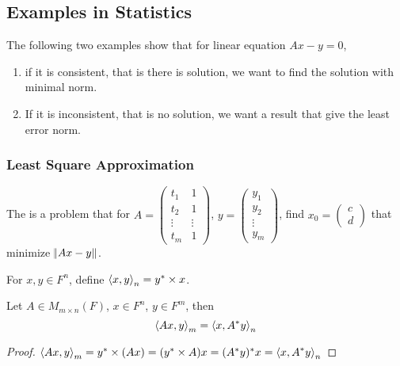 \subsection{Examples in Statistics}

The following two examples show that for linear equation $Ax - y = 0$, 
\begin{enumerate}
    \item if it is consistent, that is there is solution, we want to find the solution with minimal norm.
    \item If it is inconsistent, that is no solution, we want a result that give the least error norm.
\end{enumerate}


\subsubsection{Least Square Approximation}


\begin{definition}
    The  is a problem that for $A = \begin{pmatrix}
        t_1 & 1 \\
        t_2 & 1 \\
        \vdots & \vdots \\
        t_m & 1
    \end{pmatrix}$,  $y = \begin{pmatrix}
        y_1\\
        y_2\\
        \vdots\\
        y_m
    \end{pmatrix}$, find $x_0 = \begin{pmatrix}
        c \\
        d
    \end{pmatrix}$ that minimize $\norm{Ax-y}$.
\end{definition}

\begin{definition}
    For $x,y \in F^n$, define $\left\langle \displaystyle x, y \right\rangle_n = y^* \times x$.
\end{definition}


\begin{theorem}
    Let $A \in M_{m \times n} (F)$, $x \in F^n$, $y\in F^m$, then
    \begin{equation}
        \left\langle \displaystyle Ax, y \right\rangle_m = \left\langle \displaystyle x, A^* y \right\rangle_n
    \end{equation}
\end{theorem}
\begin{proof}
    $\left\langle \displaystyle Ax, y \right\rangle_m = y^* \times (Ax) = (y^* \times A) x = (A^* y)^* x = \left\langle \displaystyle x, A^* y \right\rangle_n$
\end{proof}

